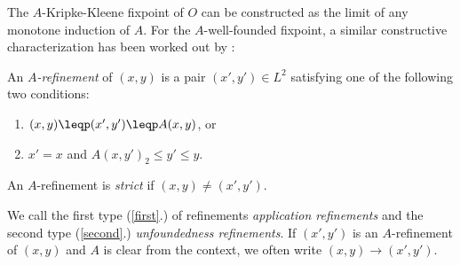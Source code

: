 {%
% 
% 
The $A$-Kripke-Kleene fixpoint of $O$ can be constructed as the limit of any monotone induction of $A$. 
For the $A$-well-founded fixpoint, a similar constructive characterization has been worked out by \citet{lpnmr/DeneckerV07}:
 

\begin{definition}\label{002:def:refinement}
An \emph{$A$-refinement} of $(x,y)$ is a pair $(x',y')\in L^2$ satisfying one of the following two conditions:
\begin{enumerate}
	\item $(x,y)\leqp(x',y')\leqp A(x,y)$, or \label{first}
	\item $x'=x$ and  $A(x,y')_2\leq y'\leq y$. \label{second}
\end{enumerate}
An $A$-refinement is \emph{strict} if $(x,y)\neq (x',y')$.
\end{definition}

We call the first type (\ref{first}.) of refinements \emph{application refinements} and the second type (\ref{second}.) \emph{unfoundedness refinements}. If $(x',y')$ is an $A$-refinement of $(x,y)$ and $A$ is clear from the context, we often write $(x,y)\to(x',y')$.
%

}
